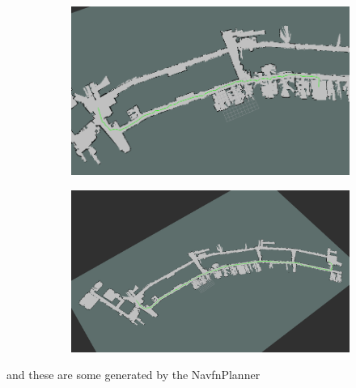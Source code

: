 \begin{figure}[h]
	\begin{subfigure}{.5\textwidth}
		\centering
		\includegraphics[width=.8\linewidth]{img/Dstar_plan_ufficio_ingresso.png}
	\end{subfigure}%
	\begin{subfigure}{.5\textwidth}
		\centering
		\includegraphics[width=.8\linewidth]{img/Dstar_plan_disegnatori_ingresso.png}
	\end{subfigure}
\end{figure}

and these are some generated by the NavfnPlanner

